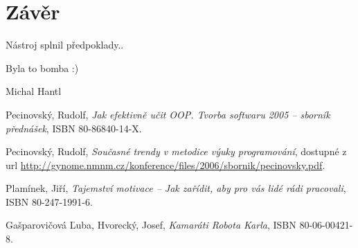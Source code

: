 \documentclass[bc,female,java,dept456]{diploma}						%
\begin{document}
\section{Závěr}
\label{sec:Conclusion}

Nástroj splnil předpoklady..

Byla to bomba :)

\bigskip
\begin{flushright}
Michal Hantl
\end{flushright}









\begin{thebibliography}{99}


 Pecinovský, Rudolf,
\textit{Jak efektivně učit OOP. Tvorba softwaru 2005 – sborník přednášek}, ISBN 80-86840-14-X.

 Pecinovský, Rudolf,
\textit{Současné trendy v metodice výuky programování}, dostupné z url \url{http://gynome.nmnm.cz/konference/files/2006/sbornik/pecinovsky.pdf}.

 Plamínek, Jiří,
\textit{Tajemství motivace – Jak zařídit, aby pro vás lidé rádi pracovali}, ISBN 80-247-1991-6.

 Gašparovičová Ľuba, Hvorecký, Josef,
\textit{Kamaráti Robota Karla}, ISBN 80-06-00421-8.

\end{thebibliography}


\end{document}
